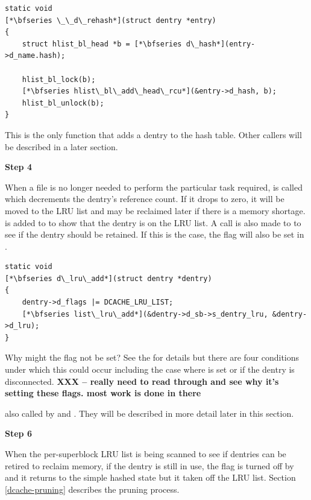 \begin{lstlisting}
static void 
[*\bfseries \_\_d\_rehash*](struct dentry *entry)
{  
    struct hlist_bl_head *b = [*\bfseries d\_hash*](entry->d_name.hash);

    hlist_bl_lock(b);
    [*\bfseries hlist\_bl\_add\_head\_rcu*](&entry->d_hash, b);
    hlist_bl_unlock(b);
}  
\end{lstlisting}

\noindent
This is the only function that adds a dentry to the hash table. Other callers will be described in a later section.

\vspace{0.25cm}
\noindent
\textbf{Step 4}  %

\vspace{0.25cm}
\noindent
When a file is no longer needed to perform the particular task required,  is called which decrements the dentry's reference count. If it drops to zero, it will be moved to the LRU list and may be reclaimed later if there is a memory shortage.  is added to  to show that the dentry is on the LRU list. A call is also made to  to see if the dentry should be retained. If this is the case, the  flag will also be set in .

\begin{lstlisting}
static void 
[*\bfseries d\_lru\_add*](struct dentry *dentry)
{   
    dentry->d_flags |= DCACHE_LRU_LIST;
    [*\bfseries list\_lru\_add*](&dentry->d_sb->s_dentry_lru, &dentry->d_lru);
}    
\end{lstlisting}

\noindent
Why might the  flag not be set? See the  for details but there are four conditions under which this could occur including the case where  is set or if the dentry is disconnected. \textbf{XXX -- really need to read through  and see why it's setting these flags. most work is done in there}

 also called by  and . They will be described in more detail later in this section.

\vspace{0.25cm}
\noindent
\textbf{Step 6}  %

\vspace{0.25cm}
\noindent
When the per-superblock LRU list is being scanned to see if dentries can be retired to reclaim memory, if the dentry is still in use, the  flag is turned off by  and it returns to the simple hashed state but it taken off the LRU list. Section \ref{dcache-pruning} describes the pruning process.


